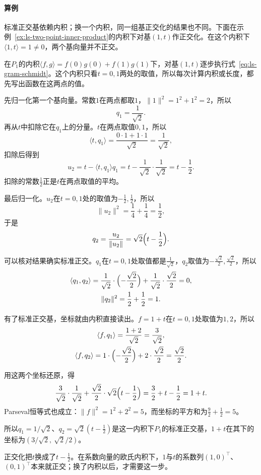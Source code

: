\paragraph{算例}
标准正交基依赖内积；换一个内积，同一组基正交化的结果也不同。下面在示例~\ref{ex:ls-two-point-inner-product}的内积下对基$(1,t)$作正交化。在这个内积下$\langle1,t\rangle=1\neq0$，两个基向量并不正交。
\begin{example}
\label{ex:ls-gram-schmidt-two-point}
在$P_1$的内积$\langle f,g\rangle=f(0)g(0)+f(1)g(1)$下，对基$(1,t)$逐步执行式~\eqref{eq:ls-gram-schmidt}。这个内积只看$t=0,1$两处的取值，所以每次计算内积或长度，都先写出函数在这两点的值。

先归一化第一个基向量。常数$1$在两点都取$1$，$\lVert1\rVert^2=1^2+1^2=2$，所以
\[
 q_1=\frac1{\sqrt2}.
\]
再从$t$中扣除它在$q_1$上的分量。$t$在两点取值$0,1$，所以
\[
 \langle t,q_1\rangle=\frac{0\cdot1+1\cdot1}{\sqrt2}=\frac1{\sqrt2},
\]
扣除后得到
\[
 u_2=t-\langle t,q_1\rangle q_1=t-\frac1{\sqrt2}\cdot\frac1{\sqrt2}=t-\frac12.
\]
扣除的常数$\tfrac12$正是$t$在两点取值的平均。

最后归一化。$u_2$在$t=0,1$处的取值为$-\tfrac12,\tfrac12$，所以
\[
 \lVert u_2\rVert^2=\frac14+\frac14=\frac12,
\]
于是
\[
 q_2=\frac{u_2}{\lVert u_2\rVert}=\sqrt2\Bigl(t-\frac12\Bigr).
\]

可以核对结果确实标准正交。$q_1$在$t=0,1$处取值都是$\tfrac1{\sqrt2}$，$q_2$取值为$-\tfrac{\sqrt2}2,\tfrac{\sqrt2}2$，所以
\[
 \begin{gathered}
 \langle q_1,q_2\rangle=\frac1{\sqrt2}\cdot\Bigl(-\frac{\sqrt2}2\Bigr)+\frac1{\sqrt2}\cdot\frac{\sqrt2}2=0,\\
 \lVert q_2\rVert^2=\frac12+\frac12=1.
 \end{gathered}
\]

有了标准正交基，坐标就由内积直接读出。$f=1+t$在$t=0,1$处取值为$1,2$，所以
\[
 \begin{gathered}
 \langle f,q_1\rangle=\frac{1+2}{\sqrt2}=\frac3{\sqrt2},\\
 \langle f,q_2\rangle=1\cdot\Bigl(-\frac{\sqrt2}2\Bigr)+2\cdot\frac{\sqrt2}2=\frac{\sqrt2}2 .
 \end{gathered}
\]

用这两个坐标还原，得
\[
 \frac3{\sqrt2}\cdot\frac1{\sqrt2}+\frac{\sqrt2}2\cdot\sqrt2\Bigl(t-\frac12\Bigr)=\frac32+t-\frac12=1+t .
\]
Parseval恒等式也成立：$\lVert f\rVert^2=1^2+2^2=5$，而坐标的平方和为$\tfrac92+\tfrac12=5$。

所以$q_1=1/\sqrt2$、$q_2=\sqrt2(t-\tfrac12)$是这一内积下$P_1$的标准正交基，$1+t$在其下的坐标为$(3/\sqrt2,\ \sqrt2/2)$。
\end{example}
正交化把$t$换成了$t-\tfrac12$。在系数向量的欧氏内积下，$1$与$t$的系数列$(1,0)^\top$、$(0,1)^\top$本来就正交；换了内积以后，才需要这一步。

